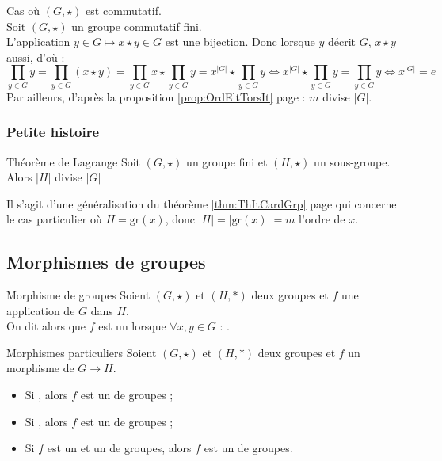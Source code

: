\documentclass[12pt,a4paper]{report}
\begin{document}
    \begin{demo}
    Cas où $(G, \star)$ est commutatif.\\
    Soit $(G, \star)$ un groupe commutatif fini.\\
    L'application $y \in G \mapsto x \star y \in G$ est une bijection. Donc lorsque $y$ décrit $G$, $x \star y$ aussi, d'où :
    $$ \prod_{y \in G} y = \prod_{y \in G} (x \star y) = \prod_{y \in G} x \star \prod_{y \in G} y = x^{|G|} \star \prod_{y \in G} y \Leftrightarrow x^{|G|} \star \prod_{y \in G} y = \prod_{y \in G} y \Leftrightarrow x^{|G|} = e$$
    Par ailleurs, d'après la proposition \ref{prop:OrdEltTorsIt} page \pageref{prop:OrdEltTorsIt} : $m$ divise $|G|$.
    \end{demo}
    
    
    \subsubsection*{Petite histoire}
    
    \begin{theoreme}{Théorème de Lagrange}{}
    Soit $(G, \star)$ un groupe fini et $(H, \star)$ un sous-groupe. Alors $|H|$ divise $|G|$
    \end{theoreme}
    
    \begin{remarque}
    Il s'agit d'une généralisation du théorème \ref{thm:ThItCardGrp} page \pageref{thm:ThItCardGrp} qui concerne le cas particulier où $H = \text{gr}(x)$, donc $|H| = |\text{gr}(x)| = m$ l'ordre de $x$.
    \end{remarque}
    
    \pagebreak
    
    \subsection{Morphismes de groupes}
    
    \begin{definition}{Morphisme de groupes}{}
    Soient $(G, \star)$ et $(H, \ast)$ deux groupes et $f$ une application de $G$ dans $H$.\\
    On dit alors que $f$ est un  lorsque $\forall x, y \in G$ : .
    \end{definition}
    
    \begin{definition}{Morphismes particuliers}{}
    Soient $(G, \star)$ et $(H, \ast)$ deux groupes et $f$ un morphisme de $G \rightarrow H$.
    \begin{itemize}[label=$\cdot$]
        \item Si , alors $f$ est un  de groupes ;
        \item Si , alors $f$ est un  de groupes ;
        \item Si $f$ est un  et un  de groupes, alors $f$ est un  de groupes.
    \end{itemize}
    \end{definition}
    
\end{document}
